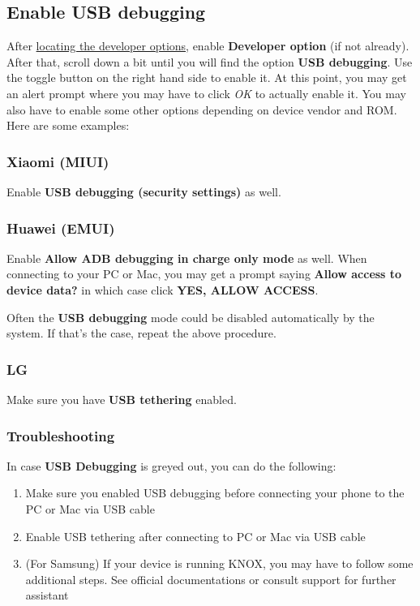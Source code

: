 \subsection{Enable USB debugging}\label{subsec:enable-usb-debugging}
After \hyperref[subsubsec:location-of-developer-options]{locating the developer options}, enable \textbf{Developer
option} (if not already). After that, scroll down a bit until you will find the option \textbf{USB debugging}. Use the
toggle button on the right hand side to enable it. At this point, you may get an alert prompt where you may have to
click \textit{OK} to actually enable it. You may also have to enable some other options depending on device vendor and
ROM. Here are some examples:

\subsubsection{Xiaomi (MIUI)}
Enable \textbf{USB debugging (security settings)} as well.

\subsubsection{Huawei (EMUI)}
Enable \textbf{Allow ADB debugging in charge only mode} as well. When connecting to your PC or Mac, you may get a prompt
saying \textbf{Allow access to device data?} in which case click \textbf{YES, ALLOW ACCESS}.

\begin{tip}[Notice]
    Often the \textbf{USB debugging} mode could be disabled automatically by the system. If that's the case, repeat the
    above procedure.
\end{tip}

\subsubsection{LG}
Make sure you have \textbf{USB tethering} enabled.

\subsubsection{Troubleshooting}
In case \textbf{USB Debugging} is greyed out, you can do the following:
\begin{enumerate}
    \item Make sure you enabled USB debugging before connecting your phone to the PC or Mac via USB cable
    \item Enable USB tethering after connecting to PC or Mac via USB cable
    \item (For Samsung) If your device is running KNOX, you may have to follow some additional steps. See official
    documentations or consult support for further assistant
\end{enumerate}

